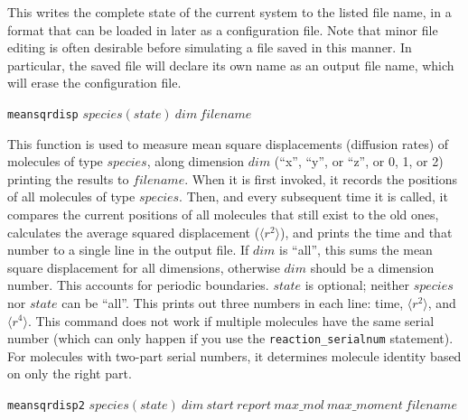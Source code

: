 \documentclass {scrbook}
\newcommand {\ttt} {\texttt}
\begin{document}
\begin{description}
This writes the complete state of the current system to the listed file name, in a format that can be loaded in later as a configuration file. Note that minor file editing is often desirable before simulating a file saved in this manner. In particular, the saved file will declare its own name as an output file name, which will erase the configuration file.

\item{\ttt{meansqrdisp} $species(state)\ dim\ filename$}

This function is used to measure mean square displacements (diffusion rates) of molecules of type $species$, along dimension $dim$ (``x'', ``y'', or ``z'', or 0, 1, or 2) printing the results to $filename$. When it is first invoked, it records the positions of all molecules of type $species$. Then, and every subsequent time it is called, it compares the current positions of all molecules that still exist to the old ones, calculates the average squared displacement ($\langle r^2 \rangle$), and prints the time and that number to a single line in the output file. If $dim$ is ``all'', this sums the mean square displacement for all dimensions, otherwise $dim$ should be a dimension number. This accounts for periodic boundaries. $state$ is optional; neither $species$ nor $state$ can be ``all''. This prints out three numbers in each line: time, $\langle r^2 \rangle$, and $\langle r^4 \rangle$. This command does not work if multiple molecules have the same serial number (which can only happen if you use the \ttt{reaction\_serialnum} statement). For molecules with two-part serial numbers, it determines molecule identity based on only the right part.

\item{\ttt{meansqrdisp2} $species(state)\ dim\ start\ report\ max\_mol\ max\_moment\ filename$}


\end{description}
\end{document}
